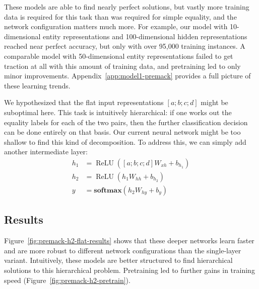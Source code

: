 \documentclass{article}
\newcommand{\Figref}[1]{Figure~\ref{#1}}
\newcommand{\figref}[1]{Figure~\ref{#1}}
\newcommand{\Appref}[1]{Appendix~\ref{#1}}
\newcommand{\softmax}{\mathbf{softmax}}
\DeclareMathOperator{\ReLU}{ReLU}
\begin{document}
These models are able to find nearly perfect solutions, but vastly more training data is required for this task than was required for simple equality, and the network configuration matters much more. For example, our model with 10-dimensional entity representations and 100-dimensional hidden representations reached near perfect accuracy, but only with over 95,000 training instances. A comparable model with 50-dimensional entity representations failed to get traction at all with this amount of training data, and pretraining led to only minor improvements. \Appref{app:model1-premack} provides a full picture of these learning trends.

We hypothesized that the flat input representations $[a;b;c;d]$ might be suboptimal here. This task is intuitively hierarchical: if one works out the equality labels for each of the two pairs, then the further classification decision can be done entirely on that basis. Our current neural network might be too shallow to find this kind of decomposition. To address this, we can simply add another intermediate layer:
%
\begin{align}
h_{1} &= \ReLU([a;b;c;d]W_{xh} + b_{h_{1}}) \label{eq:x2h1}\\
h_{2} &= \ReLU(h_{1}W_{hh} + b_{h_{2}}) \label{eq:x2h2}\\
y &= \softmax(h_{2}W_{hy} + b_{y}) \label{eq:h2y2}
\end{align}


\subsection{Results}

\Figref{fig:premack-h2-flat-results} shows that these deeper networks learn faster and are more robust to different network configurations than the single-layer variant. Intuitively, these models are better structured to find hierarchical solutions to this hierarchical problem. Pretraining led to further gains in training speed (\figref{fig:premack-h2-pretrain}).
\end{document}
